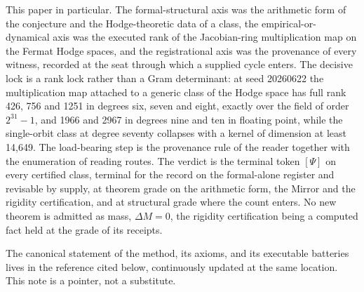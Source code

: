 \documentclass[10pt,twocolumn]{article}
\begin{document}
This paper in particular. The formal-structural axis was the arithmetic
form of the conjecture and the Hodge-theoretic data of a class, the
empirical-or-dynamical axis was the executed rank of the Jacobian-ring
multiplication map on the Fermat Hodge spaces, and the registrational
axis was the provenance of every witness, recorded at the seat through
which a supplied cycle enters. The decisive lock is a rank lock rather
than a Gram determinant: at seed 20260622 the multiplication map
attached to a generic class of the Hodge space has full rank 426, 756
and 1251 in degrees six, seven and eight, exactly over the field of
order \(2^{31}-1\), and 1966 and 2967 in degrees nine and ten in
floating point, while the single-orbit class at degree seventy collapses
with a kernel of dimension at least 14,649. The load-bearing step is the
provenance rule of the reader together with the enumeration of reading
routes. The verdict is the terminal token \([\Psi]\) on every certified
class, terminal for the record on the formal-alone register and
revisable by supply, at theorem grade on the arithmetic form, the Mirror
and the rigidity certification, and at structural grade where the count
enters. No new theorem is admitted as mass, \(\Delta M=0\), the rigidity
certification being a computed fact held at the grade of its receipts.

The canonical statement of the method, its axioms, and its executable
batteries lives in the reference cited below, continuously updated at
the same location. This note is a pointer, not a substitute.
\end{document}
